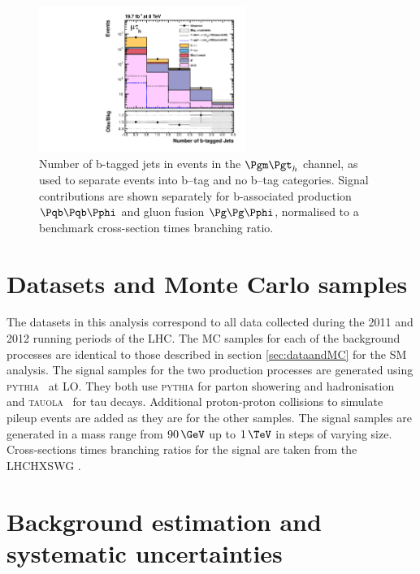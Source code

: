 \begin{figure}[tbh]
\includegraphics[width=0.6\textwidth]{plots/htt-mssm/n_bjets_inclusive_mt_2012_log.pdf}

\caption[Number of b-tagged jets in events in the $\mutau$ channel, as used to separate
events into b--tag and no b--tag categories.]{Number of b-tagged jets in events
in the $\mutau$ channel, as used to separate
events into b--tag and no b--tag categories. Signal contributions are shown
separately for b-associated production $\Pqb\Pqb\Pphi$ and gluon fusion
$\Pg\Pg\Pphi$, normalised to a benchmark cross-section times branching ratio.}
\label{fig:nbtag}
\end{figure}

\section{Datasets and Monte Carlo samples}
\label{sec:mssmdataandMC}

The datasets in this analysis correspond to all data collected during the 2011
and 2012 running periods of the LHC.
The \ac{MC} samples for each of the background processes are
identical to those described in section \ref{sec:dataandMC} for the \ac{SM}
analysis. The signal samples for the two production processes are
generated using \textsc{pythia}~\cite{Sjostrand:2006za} at \ac{LO}. They both use \textsc{pythia}
for parton showering and hadronisation and \textsc{tauola}~\cite{TAUOLA} for tau
decays. Additional proton-proton collisions to simulate pileup events are added
as they are for the other samples. The signal samples are generated in a mass range from
$90\,\GeV$ up to $1\,\TeV$ in steps of varying size. Cross-sections times
branching ratios for the signal are taken from the \ac{LHCHXSWG}
\cite{LHCHiggsCrossSectionWorkingGroup:2011ti,Dittmaier:2012vm,Heinemeyer:2013tqa}.

\section{Background estimation and systematic uncertainties}
\label{sec:mssmBackgroundsSysts}

